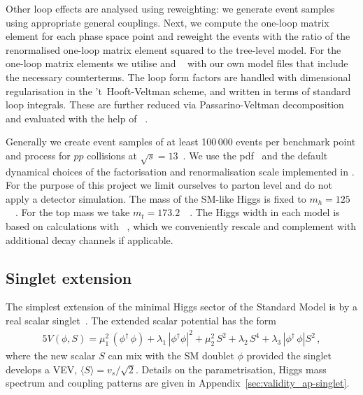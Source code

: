 Other loop effects are analysed using reweighting: we generate event
samples using appropriate general couplings. Next, we compute the
one-loop matrix element for each phase space point and reweight the
events with the ratio of the renormalised one-loop matrix element
squared to the tree-level model. For the one-loop matrix elements we
utilise  and ~\cite{Hahn:2000kx}
with our own model files that include the necessary counterterms. The
loop form factors are handled with dimensional regularisation in the
't~Hooft-Veltman scheme, and written in terms of standard loop
integrals. These are further reduced via Passarino-Veltman
decomposition and evaluated with the help of
~\cite{Hahn:1998yk}.

Generally we create event samples of at least 100\,000 events per
benchmark point and process for $pp$ collisions at $\sqrt{s} =
13$~\tev. We use the  pdf~\cite{CTEQ6L} and the
default dynamical choices of the factorisation and renormalisation
scale implemented in . For the purpose of this
project we limit ourselves to parton level and do not apply a detector
simulation.  The mass of the SM-like Higgs is fixed to $m_h =
125$~\gev~\cite{higgsmass}. For the top mass we take $m_t =
173.2$~\gev~\cite{topmass}. The Higgs width in each model is based on
calculations with ~\cite{hdecay}, which we
conveniently rescale and complement with additional decay channels if
applicable.



\subsection{Singlet extension}
\label{sec:validity_singlet}

The simplest extension of the minimal Higgs sector of the Standard
Model is by a real scalar singlet~\cite{singlet}. The extended scalar
potential has the form
%
\begin{alignat}{5} V(\phi,S) = \mu^2_1\,(\phi^\dagger\,\phi) +
\lambda_1\,|\phi^{\dagger}\phi|^2 + \mu^2_2\,S^2 + \lambda_2\,S^4 +
\lambda_3\,|\phi^{\dagger}\,\phi|S^2 \,,
\label{eq:singlet-potential}
\end{alignat}
%
where the new scalar $S$ can mix with the SM doublet $\phi$ provided
the singlet develops a VEV, $\langle S \rangle =
v_s/\sqrt{2}$. Details on the parametrisation, Higgs mass spectrum and
coupling patterns are given in Appendix~\ref{sec:validity_ap-singlet}.

